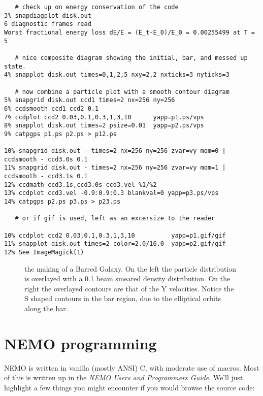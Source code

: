 \begin{itemize}
\begin{itemize}
\begin{verbatim}
   # check up on energy conservation of the code
3% snapdiagplot disk.out
6 diagnostic frames read
Worst fractional energy loss dE/E = (E_t-E_0)/E_0 = 0.00255499 at T = 5

   # nice composite diagram showing the initial, bar, and messed up state.
4% snapplot disk.out times=0,1,2,5 nxy=2,2 nxticks=3 nyticks=3

   # now combine a particle plot with a smooth contour diagram
5% snapgrid disk.out ccd1 times=2 nx=256 ny=256
6% ccdsmooth ccd1 ccd2 0.1
7% ccdplot ccd2 0.03,0.1,0.3,1,3,10      yapp=p1.ps/vps
8% snapplot disk.out times=2 psize=0.01  yapp=p2.ps/vps 
9% catpgps p1.ps p2.ps > p12.ps

10% snapgrid disk.out - times=2 nx=256 ny=256 zvar=vy mom=0 | ccdsmooth - ccd3.0s 0.1
11% snapgrid disk.out - times=2 nx=256 ny=256 zvar=vy mom=1 | ccdsmooth - ccd3.1s 0.1
12% ccdmath ccd3.1s,ccd3.0s ccd3.vel %1/%2
13% ccdplot ccd3.vel -0.9:0.9:0.3 blankval=0 yapp=p3.ps/vps
14% catpgps p2.ps p3.ps > p23.ps

   # or if gif is used, left as an excersize to the reader

10% ccdplot ccd2 0.03,0.1,0.3,1,3,10          yapp=p1.gif/gif
11% snapplot disk.out times=2 color=2.0/16.0  yapp=p2.gif/gif
12% See ImageMagick(1)

\end{verbatim}\normalsize

\begin{figure}[t]
\caption[A Barred Galaxy]
{the making of a Barred Galaxy. On the left the particle distribution
is overlayed with a 0.1 beam smeared density distribution. On the right
the overlayed contours are that of the Y velocities. Notice the S shaped
contours in the bar region, due to the elliptical orbits along the bar.
}
\end{figure}


\chapter                {NEMO programming}

NEMO is written in vanilla (mostly ANSI) C, with moderate use of
macros. Most of this is written up in the 
{\it NEMO Users and Programmers Guide}. We'll just highlight a few 
things you might encounter if you would browse the source code:


\end{itemize}
\end{itemize}
